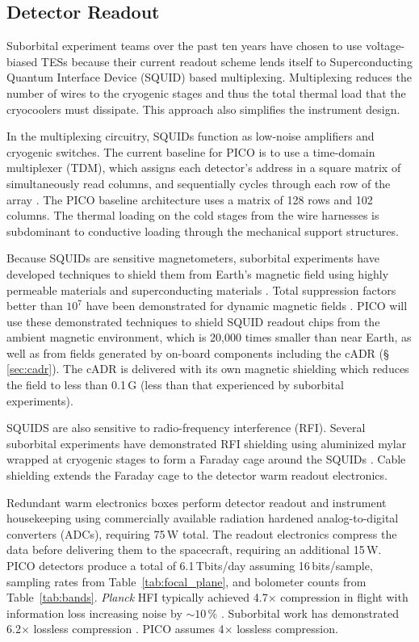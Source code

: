 \subsection{Detector Readout}
\label{sec:detector_readout} %

Suborbital experiment teams over the past ten years have chosen to use voltage-biased TESs because their current readout scheme lends itself to Superconducting Quantum Interface Device (SQUID) based multiplexing. Multiplexing reduces the number of wires to the cryogenic stages and thus the total thermal load that the cryocoolers must dissipate. This approach also simplifies the instrument design.

In the multiplexing circuitry, SQUIDs function as low-noise amplifiers and cryogenic switches. The current baseline for PICO is to use a time-domain multiplexer (TDM), which assigns each detector's address in a square matrix of simultaneously read columns, and sequentially cycles through each row of the array \citep{Henderson2016}. The PICO baseline architecture uses a matrix of 128 rows and 102 columns.
The thermal loading on the cold stages from the wire harnesses is subdominant to conductive loading through the mechanical support structures.

Because SQUIDs are sensitive magnetometers, suborbital experiments
have developed techniques to shield them from Earth's magnetic field
using highly permeable materials and superconducting materials
\citep{Hui2018}.  Total suppression factors better than $10^7$ have
been demonstrated for dynamic magnetic fields \citep{Runyan2010}. PICO
will use these demonstrated techniques to shield SQUID readout chips
from the ambient magnetic environment, which is 20,000 times smaller
than near Earth, as well as from fields generated by on-board
components including the cADR (\S\,\ref{sec:cadr}). The cADR is
delivered with its own magnetic shielding which reduces the field to
less than 0.1\,G (less than that experienced by suborbital
experiments).

SQUIDS are also sensitive to radio-frequency interference
(RFI). Several suborbital experiments have demonstrated RFI shielding
using aluminized mylar wrapped at cryogenic stages to form a Faraday
cage around the SQUIDs \citep{Kermish2012,EBEX2018,BICEP2014}.
 Cable shielding extends the Faraday cage to
the detector warm readout electronics.

Redundant warm electronics boxes perform detector readout and
instrument housekeeping using commercially available radiation
hardened analog-to-digital converters (ADCs), requiring 75\,W total.
The readout electronics compress the data before delivering them to
the spacecraft, requiring an additional 15\,W. PICO detectors produce
a total of 6.1\,Tbits/day assuming 16\,bits/sample, sampling rates
from Table~\ref{tab:focal_plane}, and bolometer counts from
Table~\ref{tab:bands}. \textit{Planck} HFI typically achieved
4.7$\times$ compression in flight with information loss increasing
noise by $\sim10\,\%$ \citep{Pajot2018,PlanckHFI2011}. Suborbital work
has demonstrated 6.2$\times$ lossless compression
\citep{EBEX2017}. PICO assumes 4$\times$ lossless compression.

